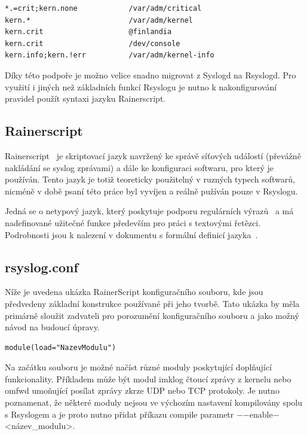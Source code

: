 \documentclass[thesis=B,czech]{FITthesis}[2012/06/26]
\begin{document}
\begin{lstlisting}[style=RainerScriptStyle]
*.=crit;kern.none            /var/adm/critical
kern.*                       /var/adm/kernel
kern.crit                    @finlandia
kern.crit                    /dev/console
kern.info;kern.!err          /var/adm/kernel-info
\end{lstlisting}

Díky této podpoře je možno velice snadno migrovat z Syslogd na Rsyslogd.
Pro využití i jiných než základních funkcí Rsyslogu je nutno k nakonfigurování pravidel použít syntaxi jazyku Rainerscript.

\subsection{Rainerscript}
Rainerscript~\cite{RainerScript} je skriptovací jazyk navržený ke správě síťových událostí (převážně nakládání se syslog zprávami) a dále ke konfiguraci softwaru, pro který je používán.
Tento jazyk je totiž teoreticky použitelný v ruzných typech softwarů, nicméně v době psaní této práce byl vyvíjen a reálně pužíván pouze v Rsyslogu.

Jedná se o netypový jazyk, který poskytuje podporu regulárních výrazů~\cite{RainerScriptPropertyReplacer} a má nadefinované užitečné funkce především pro práci s textovými řetězci.
Podrobnosti jsou k nalezení v dokumentu s formální definicí jazyka~\cite{RainerScriptFormalDefinition}.

\subsection{rsyslog.conf}
Níže je uvedena ukázka RainerScript konfiguračního souboru, kde jsou předvedeny základní konstrukce používané při jeho tvorbě. Tato ukázka by měla primárně sloužit zadvateli pro porozumění konfiguračního souboru a jako možný návod na budoucí úpravy.

\begin{lstlisting}[style=RainerScriptSimpleStyle]
module(load="NazevModulu")
\end{lstlisting}
Na začátku souboru je možné načíst různé moduly poskytující doplňující funkcionality. Příkladem může být modul imklog čtoucí zprávy z kernelu nebo omfwd umoňující posílat zprávy zkrze UDP nebo TCP protokoly. Je nutno poznamenat, že některé moduly nejsou ve výchozím nastavení kompilovány spolu s Rsyslogem a je proto nutno přidat příkazu compile parametr $-$$-$enable$-$<název\_modulu>.
\end{document}
